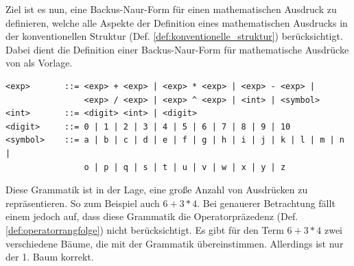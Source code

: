 \documentclass[11pt]{article}
\newcommand{\lab}[1]{(Def. \ref{#1})}
\begin{document}
Ziel ist es nun, eine Backus-Naur-Form für einen mathematischen Ausdruck 
zu definieren, welche alle Aspekte der Definition 
eines mathematischen Ausdrucks in der konventionellen Struktur 
\lab{def:konventionelle_struktur} berücksichtigt. Dabei dient die
Definition einer Backus-Naur-Form für mathematische Ausdrücke von \citeauthor{BNF_PT}
\cite{BNF_PT} als Vorlage.

\begin{verbatim}
<exp>       ::= <exp> + <exp> | <exp> * <exp> | <exp> - <exp> | 
                <exp> / <exp> | <exp> ^ <exp> | <int> | <symbol>
<int>       ::= <digit> <int> | <digit>
<digit>     ::= 0 | 1 | 2 | 3 | 4 | 5 | 6 | 7 | 8 | 9 | 10
<symbol>    ::= a | b | c | d | e | f | g | h | i | j | k | l | m | n | 
                o | p | q | s | t | u | v | w | x | y | z
\end{verbatim}

Diese Grammatik ist in der Lage, eine große Anzahl von Ausdrücken zu repräsentieren. 
So zum Beispiel auch $6+3*4$. Bei genauerer Betrachtung fällt einem jedoch auf, 
dass diese Grammatik die Operatorpräzedenz \lab{def:operatorrangfolge} 
nicht berücksichtigt. 
Es gibt für den Term $6+3*4$ zwei verschiedene Bäume, 
die mit der Grammatik übereinstimmen. 
Allerdings ist nur der 1. Baum korrekt. 
\end{document}
